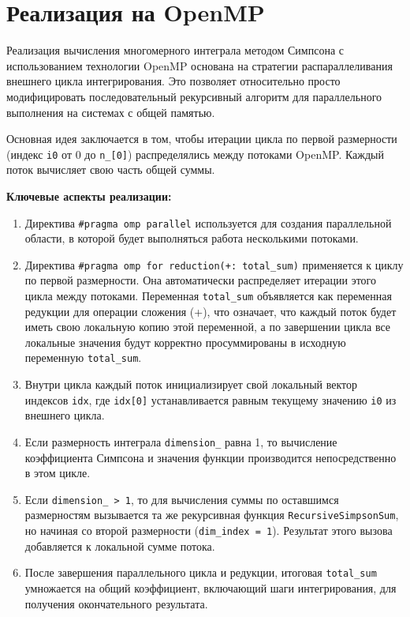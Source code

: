 \documentclass[a4paper,12pt]{article}
\begin{document}
\newpage
\section{Реализация на OpenMP}
\label{sec:omp_implementation}

Реализация вычисления многомерного интеграла методом Симпсона с использованием технологии OpenMP основана на стратегии распараллеливания внешнего цикла интегрирования. Это позволяет относительно просто модифицировать последовательный рекурсивный алгоритм для параллельного выполнения на системах с общей памятью.

Основная идея заключается в том, чтобы итерации цикла по первой размерности (индекс \texttt{i0} от 0 до \texttt{n\_[0]}) распределялись между потоками OpenMP. Каждый поток вычисляет свою часть общей суммы.

\textbf{Ключевые аспекты реализации:}
\begin{enumerate}
    \item Директива \texttt{\#pragma omp parallel} используется для создания параллельной области, в которой будет выполняться работа несколькими потоками.
    \item Директива \texttt{\#pragma omp for reduction(+: total\_sum)} применяется к циклу по первой размерности. Она автоматически распределяет итерации этого цикла между потоками. Переменная \texttt{total\_sum} объявляется как переменная редукции для операции сложения (+), что означает, что каждый поток будет иметь свою локальную копию этой переменной, а по завершении цикла все локальные значения будут корректно просуммированы в исходную переменную \texttt{total\_sum}.
    \item Внутри цикла каждый поток инициализирует свой локальный вектор индексов \texttt{idx}, где \texttt{idx[0]} устанавливается равным текущему значению \texttt{i0} из внешнего цикла.
    \item Если размерность интеграла \texttt{dimension\_} равна 1, то вычисление коэффициента Симпсона и значения функции производится непосредственно в этом цикле.
    \item Если \texttt{dimension\_ > 1}, то для вычисления суммы по оставшимся размерностям вызывается та же рекурсивная функция \texttt{RecursiveSimpsonSum}, но начиная со второй размерности (\texttt{dim\_index = 1}). Результат этого вызова добавляется к локальной сумме потока.
    \item После завершения параллельного цикла и редукции, итоговая \texttt{total\_sum} умножается на общий коэффициент, включающий шаги интегрирования, для получения окончательного результата.
\end{enumerate}
\end{document}
